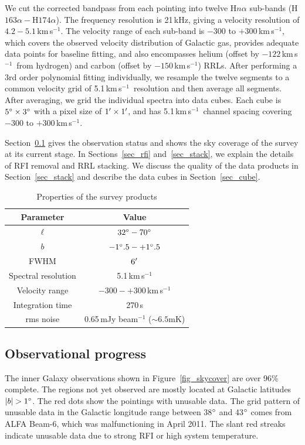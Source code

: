 \documentclass[manuscript]{aastex61}
\newcommand{\kms}{\,km\,s$^{-1}$}
\begin{document}
We cut the corrected bandpass from each pointing into twelve H$n\alpha$ sub-bands (H$163\alpha - $H$174\alpha$).
The frequency resolution is 21\,kHz, giving a velocity resolution of $4.2 - 5.1$\kms.  
The velocity range of each sub-band is $-300$ to $+300$\kms, which covers the observed velocity distribution of Galactic gas, provides adequate data points for baseline fitting, and also encompasses helium (offset by $-122$\kms\ from hydrogen) and carbon (offset by $-150$\kms) RRLs.
After performing a 3rd order polynomial fitting individually, we resample the twelve segments to a common velocity grid of 5.1\kms\ resolution and then average all segments.
After averaging, we grid the individual spectra into data cubes.  
Each cube is $5\mbox{$^\circ$} \times 3\mbox{$^\circ$}$ with a pixel size of $1\mbox{$^\prime$} \times 1 \mbox{$^\prime$}$, and has 5.1\kms\ channel spacing covering $-300$ to $+300$\kms.

Section~\ref{sec_obs} gives the observation status and shows the sky coverage of the survey at its current stage.
In Sections~\ref{sec_rfi} and~\ref{sec_stack}, we explain the details of RFI removal and RRL stacking.
We discuss the quality of the data products in Section~\ref{sec_stack} and describe the data cubes in Section~\ref{sec_cube}.

\begin{table}[tbhp]
\centering
\caption{Properties of the survey products \label{tab_survey}}
\begin{threeparttable}
\begin{tabular}{cc}
\hline
\hline
 Parameter & Value\\
\hline
$\ell$  & $32\mbox{$^\circ$} - 70\mbox{$^\circ$}$ \\
$b$  & $-1\mbox{$^\circ$}.5 - +1\mbox{$^\circ$}.5$ \\
FWHM & $6\mbox{$^\prime$}$ \\
Spectral resolution & 5.1\kms \\
Velocity range & $-300 - +300$\kms\\
Integration time & 270\,s \\
rms noise & 0.65\,mJy beam$^{-1}$ ($\sim6.5$mK) \\
\hline
\end{tabular}
\end{threeparttable}
\end{table}

\subsection{Observational progress} \label{sec_obs}
The inner Galaxy observations shown in Figure~\ref{fig_skycover} are over 96\% complete.
The regions not yet observed are mostly located at Galactic latitudes $|b|>1\degr$.  The red dots show the pointings with unusable data.  The grid pattern of unusable data in the Galactic longitude range between 38$\mbox{$^\circ$}$ and 43$\mbox{$^\circ$}$ comes from ALFA Beam-6, which was malfunctioning in April 2011.
The slant red streaks indicate unusable data due to strong RFI or high system temperature.
\end{document}
